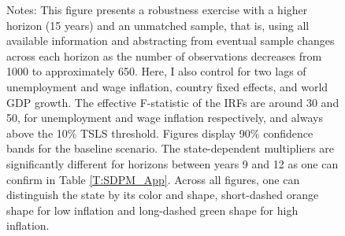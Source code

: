 \documentclass[12pt]{article}
\newcommand{\annote}[1]{\parbox{\textwidth}{\renewcommand{\baselinestretch}{1.0}\vspace{12pt} \footnotesize Notes: #1}}
\begin{document}
\begin{appendices}
\begin{singlespace}
\begin{figure}[h!]
\begin{subfigure}[b]{0.8\textwidth}
		\end{subfigure}
		\annote{This figure presents a robustness exercise with a higher horizon (15 years) and an unmatched sample, that is, using all available information and abstracting from eventual sample changes across each horizon as the number of observations decreases from 1000 to approximately 650. Here, I also control for two lags of unemployment and wage inflation, country fixed effects, and world GDP growth. The \cite{Olea2013} effective F-statistic of the IRFs are around 30 and 50, for unemployment and wage inflation respectively, and always above the 10\% TSLS threshold. Figures display 90\% confidence bands for the baseline scenario. The state-dependent multipliers are significantly different for horizons between years 9 and 12 as one can confirm in Table \ref{T:SDPM_App}. Across all figures, one can distinguish the state by its color and shape, short-dashed orange shape for low inflation and long-dashed green shape for high inflation.}
	
\end{figure}



\end{singlespace}
\end{appendices}
\end{document}
